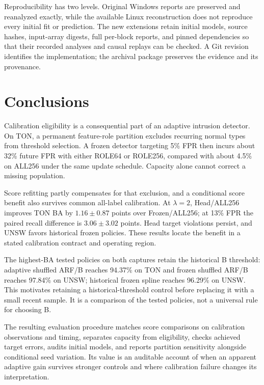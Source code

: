Reproducibility has two levels. Original Windows reports are preserved and reanalyzed exactly, while the available Linux reconstruction does not reproduce every initial fit or prediction. The new extensions retain initial models, source hashes, input-array digests, full per-block reports, and pinned dependencies so that their recorded analyses and causal replays can be checked. A Git revision identifies the implementation; the archival package preserves the evidence and its provenance.

\section{Conclusions}
Calibration eligibility is a consequential part of an adaptive intrusion detector. On TON, a permanent feature-role partition excludes recurring normal types from threshold selection. A frozen detector targeting 5\% FPR then incurs about 32\% future FPR with either ROLE64 or ROLE256, compared with about 4.5\% on ALL256 under the same update schedule. Capacity alone cannot correct a missing population.

Score refitting partly compensates for that exclusion, and a conditional score benefit also survives common all-label calibration. At $\lambda=2$, Head/ALL256 improves TON BA by $1.16\pm0.87$ points over Frozen/ALL256; at 13\% FPR the paired recall difference is $3.06\pm3.02$ points. Head target violations persist, and UNSW favors historical frozen policies. These results locate the benefit in a stated calibration contract and operating region.

The highest-BA tested policies on both captures retain the historical B threshold: adaptive shuffled ARF/B reaches 94.37\% on TON and frozen shuffled ARF/B reaches 97.84\% on UNSW; historical frozen spline reaches 96.29\% on UNSW. This motivates retaining a historical-threshold control before replacing it with a small recent sample. It is a comparison of the tested policies, not a universal rule for choosing B.

The resulting evaluation procedure matches score comparisons on calibration observations and timing, separates capacity from eligibility, checks achieved target errors, audits initial models, and reports partition sensitivity alongside conditional seed variation. Its value is an auditable account of when an apparent adaptive gain survives stronger controls and where calibration failure changes its interpretation.

